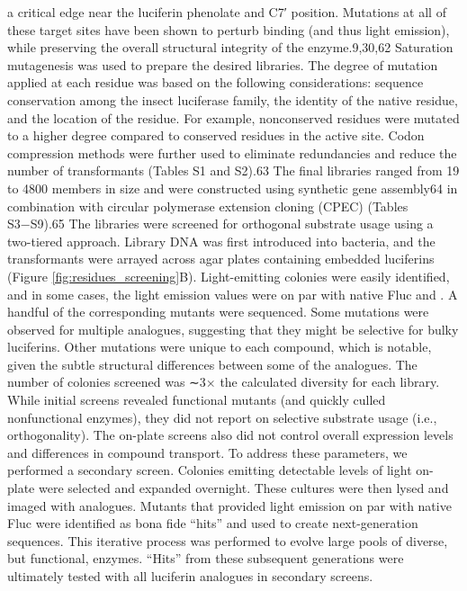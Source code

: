 a critical edge near the luciferin phenolate and C7′ position.
Mutations at all of these target sites have been shown to perturb \dluciferin{} binding (and thus light emission), while
preserving the overall structural integrity of the enzyme.9,30,62
Saturation mutagenesis was used to prepare the desired
libraries. The degree of mutation applied at each residue was
based on the following considerations: sequence conservation
among the insect luciferase family, the identity of the native
residue, and the location of the residue. For example,
nonconserved residues were mutated to a higher degree
compared to conserved residues in the active site. Codon
compression methods were further used to eliminate
redundancies and reduce the number of transformants (Tables
S1 and S2).63 The final libraries ranged from 19 to 4800
members in size and were constructed using synthetic gene
assembly64 in combination with circular polymerase extension
cloning (CPEC) (Tables S3−S9).65
The libraries were screened for orthogonal substrate usage
using a two-tiered approach. Library DNA was first introduced
into bacteria, and the transformants were arrayed across agar
plates containing embedded luciferins (Figure \ref{fig:residues_screening}B). Light-emitting
colonies were easily identified, and in
some cases, the light emission values were on par with native
Fluc and \dluciferin{}. A handful of the
corresponding mutants were sequenced. Some mutations
were observed for multiple analogues, suggesting that they
might be selective for bulky luciferins. Other
mutations were unique to each compound, which is notable,
given the subtle structural differences between some of the
analogues. The number of colonies screened was ∼3× the
calculated diversity for each library.
While initial screens revealed functional mutants (and
quickly culled nonfunctional enzymes), they did not report
on selective substrate usage (i.e., orthogonality). The on-plate
screens also did not control overall expression levels and
differences in compound transport. To address these
parameters, we performed a secondary screen. Colonies
emitting detectable levels of light on-plate were selected and
expanded overnight. These cultures were then lysed and
imaged with analogues. Mutants that provided light emission
on par with native Fluc were identified as bona fide “hits” and
used to create next-generation sequences. This iterative process
was performed to evolve large pools of diverse, but functional,
enzymes. “Hits” from these subsequent generations were
ultimately tested with all luciferin analogues in secondary
screens.
